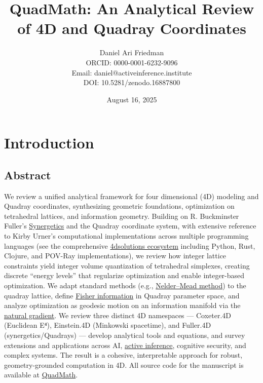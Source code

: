\documentclass[
  10pt,
]{article}
\title{QuadMath: An Analytical Review of 4D and Quadray Coordinates}
\author{Daniel Ari Friedman\\ ORCID: 0000-0001-6232-9096\\ Email: daniel@activeinference.institute\\ DOI: 10.5281/zenodo.16887800}
\date{August 16, 2025}
\begin{document}
\maketitle

{
\hypersetup{linkcolor=black}
\setcounter{tocdepth}{3}
\tableofcontents
}
\hypertarget{introduction}{%
\section{Introduction}\label{introduction}}

\hypertarget{abstract}{%
\subsection{Abstract}\label{abstract}}

We review a unified analytical framework for four dimensional (4D)
modeling and Quadray coordinates, synthesizing geometric foundations,
optimization on tetrahedral lattices, and information geometry. Building
on R. Buckminster Fuller's
\href{https://en.wikipedia.org/wiki/Synergetics_(Fuller)}{Synergetics}
and the Quadray coordinate system, with extensive reference to Kirby
Urner's computational implementations across multiple programming
languages (see the comprehensive
\href{https://github.com/4dsolutions}{4dsolutions ecosystem} including
Python, Rust, Clojure, and POV-Ray implementations), we review how
integer lattice constraints yield integer volume quantization of
tetrahedral simplexes, creating discrete ``energy levels'' that
regularize optimization and enable integer-based optimization. We adapt
standard methods (e.g.,
\href{https://en.wikipedia.org/wiki/Nelder\%E2\%80\%93Mead_method}{Nelder--Mead
method}) to the quadray lattice, define
\href{https://en.wikipedia.org/wiki/Fisher_information}{Fisher
information} in Quadray parameter space, and analyze optimization as
geodesic motion on an information manifold via the
\href{https://en.wikipedia.org/wiki/Natural_gradient}{natural gradient}.
We review three distinct 4D namespaces --- Coxeter.4D (Euclidean E⁴),
Einstein.4D (Minkowski spacetime), and Fuller.4D (synergetics/Quadrays)
--- develop analytical tools and equations, and survey extensions and
applications across AI,
\href{https://welcome.activeinference.institute/}{active inference},
cognitive security, and complex systems. The result is a cohesive,
interpretable approach for robust, geometry-grounded computation in 4D.
All source code for the manuscript is available at
\href{https://github.com/docxology/quadmath}{QuadMath}.
\end{document}
